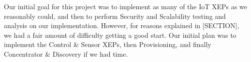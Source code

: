 Our initial goal for this project was to implement as many of the IoT XEPs as we
reasonably could, and then to perform Security and Scalability testing and
analysis on our implementation. However, for reasons explained in [SECTION], we
had a fair amount of difficulty getting a good start. Our initial plan was to
implement the Control \& Sensor XEPs, then Provisioning, and finally Concentrator
\& Discovery if we had time.
